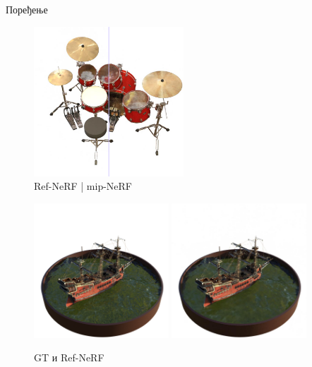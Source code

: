 \documentclass{beamer}
\begin{document}
		\begin{frame}{Поређење}
			\begin{figure}
				\centering
				\includegraphics[width=0.5\textwidth]{img/comparison/refnerf_vs_mipnerf_drums_3.png}
				\caption{Ref-NeRF | mip-NeRF}
			\end{figure}
		\end{frame}

		\begin{frame}
			\begin{figure}
				\centering
				\includegraphics[width=0.45\textwidth]{img/comparison/gt_ship_38.png}\quad
				\includegraphics[width=0.45\textwidth]{img/comparison/refnerf_ship_38.jpg}
				\caption{GT и Ref-NeRF}
			\end{figure}
		\end{frame}
\end{document}
